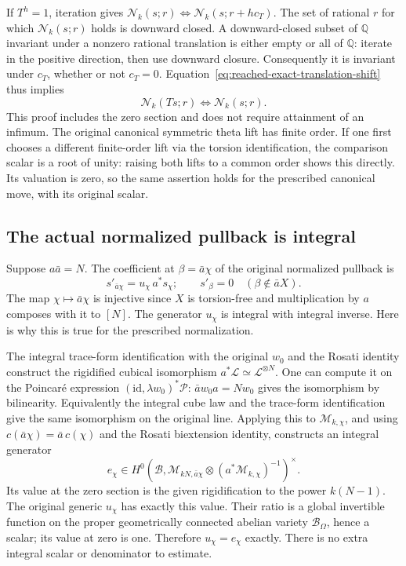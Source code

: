 If $T^h=1$, iteration gives
$\mathcal N_k(s;r)\Longleftrightarrow\mathcal N_k(s;r+hc_T)$.
The set of rational $r$ for which $\mathcal N_k(s;r)$ holds is downward
closed.  A downward-closed subset of $\mathbb Q$ invariant under a
nonzero rational translation is either empty or all of $\mathbb Q$:
iterate in the positive direction, then use downward closure.
Consequently it is invariant under $c_T$, whether or not $c_T=0$.
Equation~\eqref{eq:reached-exact-translation-shift} thus implies
\[
                 \mathcal N_k(Ts;r)\Longleftrightarrow
                 \mathcal N_k(s;r).
\]
This proof includes the zero section and does not require attainment
of an infimum.  The original canonical symmetric theta lift has finite
order.  If one first chooses a different finite-order lift via the
torsion identification, the comparison scalar is a root of unity:
raising both lifts to a common order shows this directly.  Its
valuation is zero, so the same assertion holds for the prescribed
canonical move, with its original scalar.

\subsection*{The actual normalized pullback is integral}

Suppose $a\bar a=N$.  The coefficient at
$\beta=\bar a\chi$ of the original normalized pullback is
\begin{equation}\label{eq:reached-pullback-coefficient}
             s'_{\bar a\chi}=u_\chi\,a^*s_\chi;
             \qquad s'_\beta=0\quad(\beta\notin\bar aX).
\end{equation}
The map $\chi\mapsto\bar a\chi$ is injective since $X$ is torsion-free
and multiplication by $a$ composes with it to $[N]$.
The generator $u_\chi$ is integral with integral inverse.  Here is why
this is true for the prescribed normalization.

The integral trace-form identification with the original $w_0$ and
the Rosati identity construct the rigidified cubical isomorphism
$a^*\mathscr L\simeq\mathscr L^{\otimes N}$.
One can compute it on the Poincar\'e expression
$(\mathrm{id},\lambda w_0)^*\mathscr P$:
$\bar a w_0a=Nw_0$ gives the isomorphism by bilinearity.
Equivalently the integral cube law and the trace-form identification
give the same isomorphism on the original line.  Applying this to
$\mathscr M_{k,\chi}$, and using
$c(\bar a\chi)=\bar a\,c(\chi)$ and the Rosati biextension identity,
constructs an integral generator
\[
 e_\chi\in
 H^0\!\left(\mathcal B,
   \mathscr M_{kN,\bar a\chi}\otimes(a^*\mathscr M_{k,\chi})^{-1}
       \right)^\times.
\]
Its value at the zero section is the given rigidification to the
power $k(N-1)$.  The original generic $u_\chi$ has exactly this value.
Their ratio is a global invertible function on the proper geometrically
connected abelian variety $\mathcal B_\Omega$, hence a scalar; its value
at zero is one.  Therefore $u_\chi=e_\chi$ exactly.
There is no extra integral scalar or denominator to estimate.

